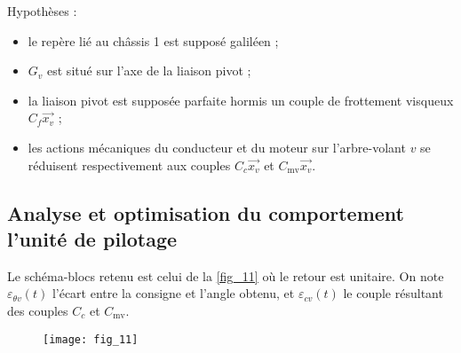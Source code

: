 \begin{multicols}{2}
Hypothèses :
\begin{itemize}
\item le repère lié au châssis 1 est supposé galiléen ;
\item $G_v$ est situé sur l'axe de la liaison pivot ;
\item la liaison pivot est supposée parfaite hormis un couple de frottement visqueux $C_f \vec{x_v}$
;
\item les actions mécaniques du conducteur et du moteur sur l'arbre-volant $v$ se réduisent
respectivement aux couples $C_c \vec{x_v}$ et $C_{\text{mv}} \vec{x_v}$.
\end{itemize}
%
%
%
%
%
%

\subsection*{Analyse et optimisation du comportement l'unité de pilotage}


Le schéma-blocs retenu est celui de la \autoref{fig_11} où le retour est unitaire. On note $\varepsilon_{\theta v}(t)$ l'écart entre la consigne et l'angle obtenu, et $\varepsilon_{c v}(t)$ le
couple résultant des couples $C_c$ et $C_{\text{mv}}$.






\begin{figure}[H]
\centering
\texttt{[image: fig\_11]}


\end{figure}
\end{multicols}
